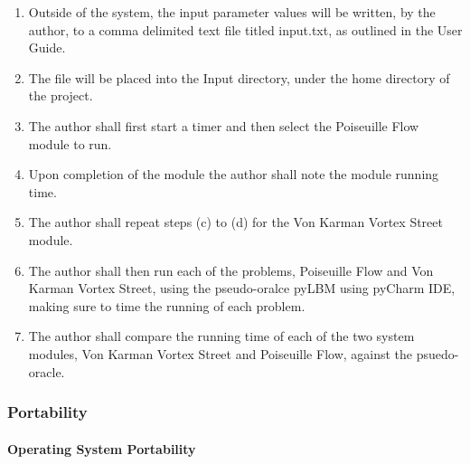 \documentclass[12pt, titlepage]{article}
\begin{document}
\begin{enumerate}
\begin{enumerate}
\item Outside of the system, the input parameter values will be written, by the author, to a comma delimited text file titled input.txt, as outlined in the User Guide.
\item The file will be placed into the Input directory, under the home directory of the project.
\item The author shall first start a timer and then select the Poiseuille Flow module to run.
\item Upon completion of the module the author shall note the module running time.
\item The author shall repeat steps (c) to (d) for the Von Karman Vortex Street module. 
\item The author shall then run each of the problems, Poiseuille Flow and Von Karman Vortex Street, using the pseudo-oralce pyLBM using pyCharm IDE, making sure to time the running of each problem.
\item The author shall compare the running time of each of the two system modules, Von Karman Vortex Street and Poiseuille Flow, against the psuedo-oracle.\\
\end{enumerate}

\end{enumerate}

\subsubsection{Portability}
		
\paragraph{Operating System Portability}
\end{document}
